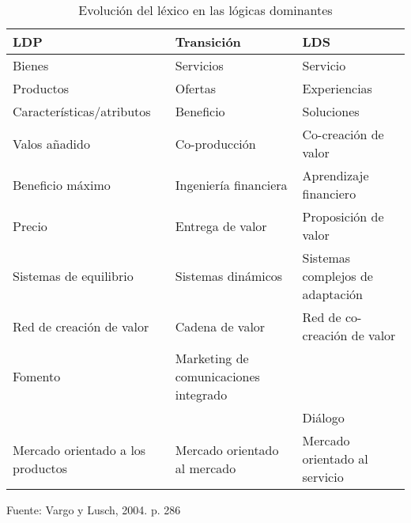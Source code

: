 \begin{table}[h]
    \caption {Evolución del léxico en las lógicas dominantes}
	\label{tab:evolucionLexica}
	\setlength\extrarowheight{5pt}
	
	\begin{tabular}{p{5cm} p{5cm} p{5cm}}
	\toprule
	LDP                               & Transición                            & LDS                              \\ \midrule
	Bienes                            & Servicios                             & Servicio                         \\
	Productos                         & Ofertas                               & Experiencias                     \\
	Características/atributos         & Beneficio                             & Soluciones                       \\
	Valos añadido                     & Co-producción                         & Co-creación de valor             \\
	Beneficio máximo                  & Ingeniería financiera                 & Aprendizaje financiero           \\
	Precio                            & Entrega de valor                      & Proposición de valor             \\
	Sistemas de equilibrio            & Sistemas dinámicos                    & Sistemas complejos de adaptación \\
	Red de creación de valor          & Cadena de valor                       & Red de co-creación de valor      \\
	Fomento                           & Marketing de comunicaciones integrado &                                  \\
		                              &                                       & Diálogo                          \\
	Mercado orientado a los productos & Mercado orientado al mercado          & Mercado orientado al servicio    \\ \bottomrule
	\end{tabular}
	
	\center
	\footnotesize
	Fuente: Vargo y Lusch, 2004. p. 286
\end{table}
